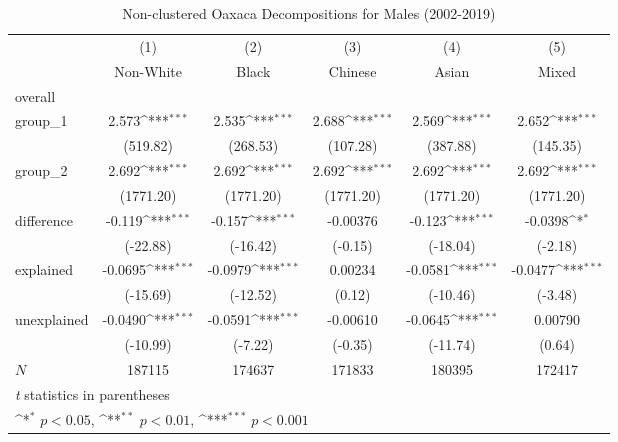\begin{table}[htbp]\centering
\def\sym#1{\ifmmode^{#1}\else\(^{#1}\)\fi}
\caption{Non-clustered Oaxaca Decompositions for Males (2002-2019)\label{tab1}}
\begin{tabular}{l*{5}{c}}
\hline\hline
            &\multicolumn{1}{c}{(1)}&\multicolumn{1}{c}{(2)}&\multicolumn{1}{c}{(3)}&\multicolumn{1}{c}{(4)}&\multicolumn{1}{c}{(5)}\\
            &\multicolumn{1}{c}{Non-White}&\multicolumn{1}{c}{Black}&\multicolumn{1}{c}{Chinese}&\multicolumn{1}{c}{Asian}&\multicolumn{1}{c}{Mixed}\\
\hline
overall     &                     &                     &                     &                     &                     \\
group\_1     &       2.573\sym{***}&       2.535\sym{***}&       2.688\sym{***}&       2.569\sym{***}&       2.652\sym{***}\\
            &    (519.82)         &    (268.53)         &    (107.28)         &    (387.88)         &    (145.35)         \\
group\_2     &       2.692\sym{***}&       2.692\sym{***}&       2.692\sym{***}&       2.692\sym{***}&       2.692\sym{***}\\
            &   (1771.20)         &   (1771.20)         &   (1771.20)         &   (1771.20)         &   (1771.20)         \\
difference  &      -0.119\sym{***}&      -0.157\sym{***}&    -0.00376         &      -0.123\sym{***}&     -0.0398\sym{*}  \\
            &    (-22.88)         &    (-16.42)         &     (-0.15)         &    (-18.04)         &     (-2.18)         \\
explained   &     -0.0695\sym{***}&     -0.0979\sym{***}&     0.00234         &     -0.0581\sym{***}&     -0.0477\sym{***}\\
            &    (-15.69)         &    (-12.52)         &      (0.12)         &    (-10.46)         &     (-3.48)         \\
unexplained &     -0.0490\sym{***}&     -0.0591\sym{***}&    -0.00610         &     -0.0645\sym{***}&     0.00790         \\
            &    (-10.99)         &     (-7.22)         &     (-0.35)         &    (-11.74)         &      (0.64)         \\
\hline
\(N\)       &      187115         &      174637         &      171833         &      180395         &      172417         \\
\hline\hline
\multicolumn{6}{l}{\footnotesize \textit{t} statistics in parentheses}\\
\multicolumn{6}{l}{\footnotesize \sym{*} \(p<0.05\), \sym{**} \(p<0.01\), \sym{***} \(p<0.001\)}\\
\end{tabular}
\label{tab:oaxaca_male_nonclustered}
\end{table}
